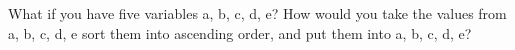 What if you have five variables a, b, c, d, e? How would you take the values from a, b, c, d, e sort them into ascending order, and put them into a, b, c, d, e?

